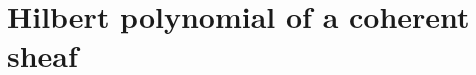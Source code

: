 
\section{Hilbert polynomial of a coherent sheaf}
\label{sec:hilbert_polynomial}

\begin{definition}
  \label{def:hilbert_polynomial}

\end{definition}
